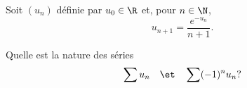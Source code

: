 \begin{enonce}
\begin{exercise}[ID={RMS135 E1451},subtitle={IMT MP 2024},tags={},difficulty={}]

Soit $(u_n)$ définie par $u_0 \in \R$ et, pour $n \in \N$,
\begin{equation*}
u_{n+1} = \frac{e^{-u_n}}{n+1}.
\end{equation*}

Quelle est la nature des séries 
\begin{equation*}
\sum u_n
\quad\et\quad 
\sum (-1)^n u_n ?
\end{equation*}

\end{exercise}
\begin{solution}
\end{solution}
\end{enonce}
